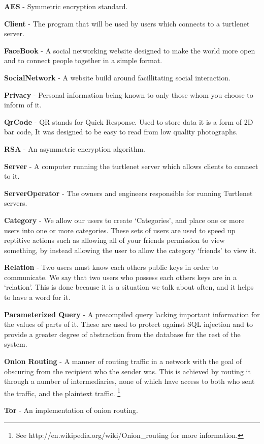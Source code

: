 \textbf{AES} - Symmetric encryption standard.

\textbf{Client} - The program that will be used by users which connects to a 
turtlenet server.

\textbf{FaceBook} - A social networking website designed to make the world more 
open and to connect people together in a simple format.

\textbf{SocialNetwork} - A website build around facillitating social
interaction.

\textbf{Privacy} - Personal information being known to only those whom you choose 
to inform of it.

\textbf{QrCode} - QR stands for Quick Response.  Used to store data it is a form 
of 2D bar code, It was designed to be easy to read from low quality photographs.

\textbf{RSA} - An asymmetric encryption algorithm.

\textbf{Server} - A computer running the turtlenet server which allows clients
to connect to it.

\textbf{ServerOperator} - The owners and engineers responsible for running 
Turtlenet servers.

\textbf{Category} - We allow our users to create `Categories', and place one or 
more users into one or more categories. These sets of users are used to speed up 
reptitive actions such as allowing all of your friends permission to view 
something, by instead allowing the user to allow the category `friends' to view 
it.

\textbf{Relation} - Two users must know each others public keys in order to 
communicate. We say that two users who possess each others keys are in a 
`relation'. This is done because it is a situation we talk about often, and it 
helps to have a word for it.

\textbf{Parameterized Query} - A precompiled query lacking important information 
for the values of parts of it. These are used to protect against SQL injection 
and to provide a greater degree of abstraction from the database for the rest of 
the system.

\textbf{Onion Routing} - A manner of routing traffic in a network with the goal 
of obscuring from the recipient who the sender was. This is achieved by routing 
it through a number of intermediaries, none of which have access to both who sent 
the traffic, and the plaintext traffic.
\footnote{See http://en.wikipedia.org/wiki/Onion\_routing for more information.}

\textbf{Tor} - An implementation of onion routing.
